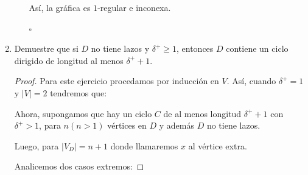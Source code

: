 \documentclass{article}
\begin{document}
\begin{enumerate}
\begin{enumerate}
      \begin{figure}[ht!]
        \centering
      \end{figure}

      Así, la gráfica es $1$-regular e inconexa.

      \hfill $\square$
  \end{enumerate}

  \item Demuestre que si $D$ no tiene lazos y $\delta^+ \ge 1$, entonces $D$
    contiene un ciclo dirigido de longitud al menos $\delta^+ + 1$.

    \renewcommand\qedsymbol{QED}
    \begin{proof}
      Para este ejercicio procedamos por inducción en $V$.
      Así, cuando $\delta^+ = 1$ y $|V| = 2$ tendremos que:

      \begin{center}
      \end{center}

      Ahora, supongamos que hay un ciclo $C$ de al menos longitud $\delta^+ +1$
      con $\delta^+ > 1$, para $n(n > 1)$ vértices en $D$ y además $D$ no
      tiene lazos.
      
      Luego, para $|V_D| = n +1$ donde llamaremos $x$ al vértice
      extra.
      
      Analicemos dos casos extremos:


\end{proof}
\end{enumerate}
\end{document}
